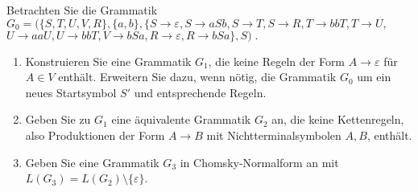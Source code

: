 \begin{exercise}
Betrachten Sie die Grammatik \\[0.2cm]
$G_0 = (\{S,T,U,V,R\},\{a,b\},\{S\longrightarrow \varepsilon, S\longrightarrow aSb,
      S\longrightarrow T, S\longrightarrow R,
      T\longrightarrow bbT, T\longrightarrow U,$\\
\hspace*{1cm}      $U \longrightarrow aaU,U \longrightarrow bb T,
      V \longrightarrow bSa, R \longrightarrow \varepsilon, 
      R \longrightarrow bSa\},S)\;.$
    \begin{enumerate}
    \item Konstruieren Sie eine Grammatik $G_1$, die
      keine Regeln der Form $A\longrightarrow \varepsilon$ für $A\in V$ enthält.
      Erweitern Sie dazu, wenn nötig, die Grammatik $G_0$ um ein neues
    	Startsymbol $S'$ und entsprechende Regeln.
    \item Geben Sie zu $G_1$ eine äquivalente Grammatik $G_2$ an, die
      keine Kettenregeln, also Produktionen der Form $A\longrightarrow B$ mit
      Nichtterminalsymbolen $A,B$, enthält. 
    \item Geben Sie eine Grammatik $G_3$ in
      Chomsky-Normalform an mit $L(G_3) = L(G_2)\setminus \{\varepsilon\}$.
    \end{enumerate}

\end{exercise}

